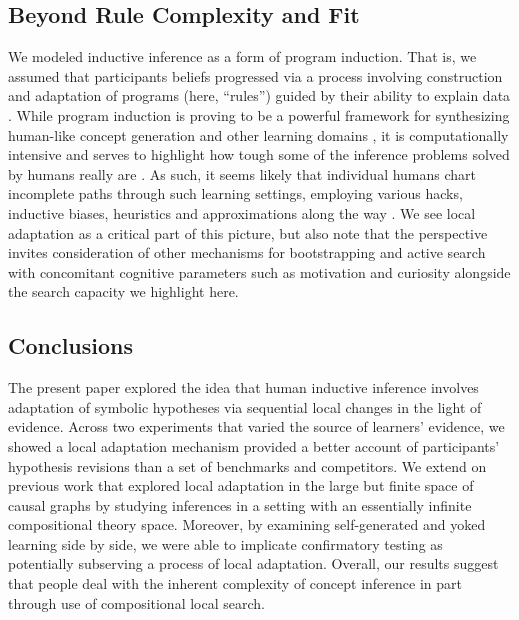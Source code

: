 \documentclass[doc,natbib,floatsintext]{apa7}
\begin{document}
\subsection{Beyond Rule Complexity and Fit}
We modeled inductive inference as a form of program induction. That is, we assumed that participants beliefs progressed via a process involving construction and adaptation of programs (here, ``rules'') guided by their ability to explain data \citep{flener2008introduction, rule2018learning}. While program induction is proving to be a powerful framework for synthesizing human-like concept generation \citep{goodman2008rational, lewis2014error, piantadosi2016logical,lake2015human} and other learning domains \citep{ullman2012theory, rothe2017question, yang2022one}, it is computationally intensive and serves to highlight how tough some of the inference problems solved by humans really are \citep{ullman2012theory}. As such, it seems likely that individual humans chart incomplete paths through such learning settings, employing various hacks, inductive biases, heuristics and approximations along the way \citep{rule2020child}. We see local adaptation as a critical part of this picture, but also note that the perspective invites consideration of other mechanisms for bootstrapping and active search with concomitant cognitive parameters such as motivation and curiosity alongside the search capacity we highlight here. 

\subsection{Conclusions}
The present paper explored the idea that human inductive inference involves adaptation of symbolic hypotheses via sequential local changes in the light of evidence. Across two experiments that varied the source of learners' evidence, we showed a local adaptation mechanism provided a better account of participants’ hypothesis revisions than a set of benchmarks and competitors.  We extend on previous work that explored local adaptation in the large but finite space of causal graphs \citep{bramley2017formalizing} by studying inferences in a setting with an essentially infinite compositional theory space. Moreover, by examining self-generated and yoked learning side by side, we were able to implicate confirmatory testing as potentially subserving a process of local adaptation. Overall, our results suggest that people deal with the inherent complexity of concept inference in part through use of compositional local search.
\end{document}
